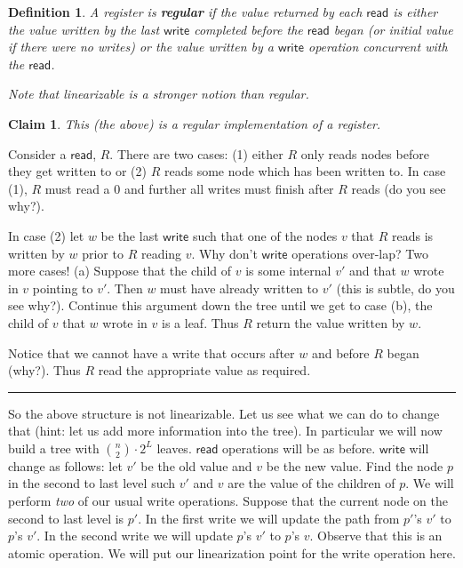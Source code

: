 \documentclass[twoside]{article}
\newtheorem{claim}[theorem]{Claim}
\newtheorem{definition}[theorem]{Definition}
\newenvironment{proof}{{\bf Proof:}}{\hfill\rule{2mm}{2mm}}
\newcommand\READ{\mathsf{read}}
\newcommand\WRITE{\mathsf{write}}
\begin{document}
\begin{definition}
A register is \textbf{regular} if the value returned by each $\READ$ is either the value written by the last $\WRITE$ completed before the $\READ$ began (or initial value if there were no writes) or the value written by a $\WRITE$ operation concurrent with the $\READ$.

Note that \emph{linearizable} is a stronger notion than \emph{regular}. 
\end{definition}

\begin{claim}
This (the above) is a regular implementation of a register. 
\end{claim}
\begin{proof}
Consider a $\READ$, $R$. There are two cases: (1) either $R$ only reads nodes before they get written to or (2) $R$ reads some node which has been written to. In case (1), $R$ must read a $0$ and further all writes must finish after $R$ reads (do you see why?).

In case (2) let $w$ be the last $\WRITE$ such that one of the nodes $v$ that $R$ reads is written by $w$ prior to $R$ reading $v$. Why don't $\WRITE$ operations over-lap? Two more cases! (a) Suppose that the child of $v$ is some internal $v'$ and that $w$ wrote in $v$ pointing to $v'$. Then $w$ must have already written to $v'$ (this is subtle, do you see why?). Continue this argument down the tree until we get to case (b), the child of $v$ that $w$ wrote in $v$ is a leaf. Thus $R$ return the value written by $w$.

Notice that we cannot have a write that occurs after $w$ and before $R$ began (why?). Thus $R$ read the appropriate value as required.   
\end{proof}

So the above structure is not linearizable. Let us see what we can do to change that (hint: let us add more information into the tree). In particular we will now build a tree with $\binom{n}{2} \cdot 2^L$ leaves. $\READ$ operations will be as before. $\WRITE$ will change as follows: let $v'$ be the old value and $v$ be the new value. Find the node $p$ in the second to last level such $v'$ and $v$ are the value of the children of $p$. We will perform \emph{two} of our usual write operations. Suppose that the current node on the second to last level is $p'$. In the first write we will update the path from $p'$'s $v'$ to $p$'s $v'$. In the second write we will update $p$'s $v'$ to $p$'s $v$. Observe that this is an atomic operation. We will put our linearization point for the write operation here. 
\end{document}
